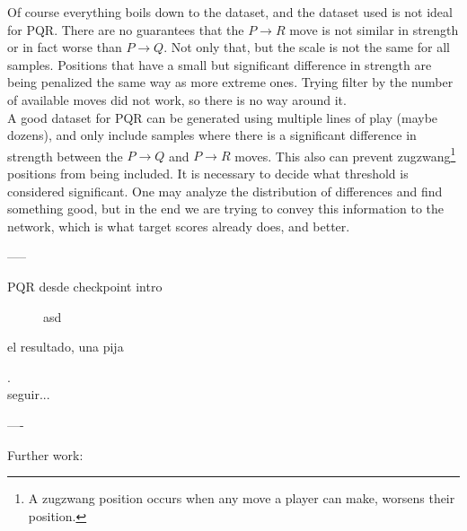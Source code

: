 Of course everything boils down to the dataset, and the dataset used is not ideal for PQR. There are no guarantees that the $P \rightarrow R$ move is not similar in strength or in fact worse than $P \rightarrow Q$. Not only that, but the scale is not the same for all samples. Positions that have a small but significant difference in strength are being penalized the same way as more extreme ones. Trying filter by the number of available moves did not work, so there is no way around it. \\

A good dataset for PQR can be generated using multiple lines of play (maybe dozens), and only include samples where there is a significant difference in strength between the $P \rightarrow Q$ and $P \rightarrow R$ moves. This also can prevent zugzwang\footnote{A zugzwang position occurs when any move a player can make, worsens their position.} positions from being included. It is necessary to decide what threshold is considered significant. One may analyze the distribution of differences and find something good, but in the end we are trying to convey this information to the network, which is what target scores already does, and better.

-----

PQR desde checkpoint intro

\begin{figure}[H]
\centering
{}
\caption{asd}
\label{pqr-ckp}
\end{figure}

el resultado, una pija

. \\

seguir...

----

Further work:
